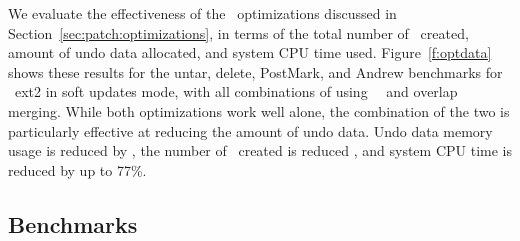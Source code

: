 \opttable{}

We evaluate the effectiveness of the \patch\ optimizations discussed in
Section~\ref{sec:patch:optimizations}, in terms of
%
the total number of \patches\ created, amount of undo data allocated,
and system CPU time used.
%
Figure~\ref{f:optdata} shows these results for the untar, delete,
PostMark, and Andrew benchmarks for \Kudos\ ext2 in soft updates mode,
with all combinations of using \nrb\ \patches\ and overlap merging.
%
While both optimizations work well alone, the combination of the two
is particularly effective at reducing the amount of undo data.
%
Undo data memory usage is reduced by \patchoptundo,
%
the number of \patches\ created is reduced \patchoptcount,
%
and system CPU time is reduced by up to 77\%.

\begin{comment}
\begin{figure}[t]
\vspace{-0.5\baselineskip}
\centering{
\texttt{[image: rb\_patch\_size]}
}
\vspace{-0.5\baselineskip}
\caption{\label{fig:patchsize-histo} \Rb\ \patch\ size histogram for a sample
workload (extracting a large archive into ext2). All the \patches\ larger than
63 bytes have been optimized into \nrb\ \patches. \Rb\ \patches\ 4 bytes and
smaller account for about 51\% of all \rb\ \patches.}
\end{figure}
\end{comment}

\subsection {Benchmarks}
\label{sec:eval:bench}

\newcommand{\safe}[1]{\textbf{#1}}
\newcommand{\unsafe}[1]{#1}

